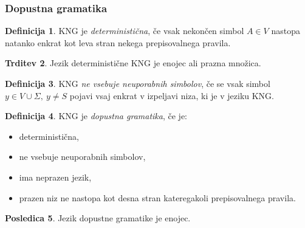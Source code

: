 \documentclass{beamer}
\theoremstyle{definition}
\newtheorem{definicija}{Definicija}[section]
\newtheorem{trditev}[definicija]{Trditev}
\newtheorem{posledica}[definicija]{Posledica}
\begin{document}
\begin{frame}
    \frametitle{Dopustna gramatika}
    \begin{definicija}
        KNG je \emph{deterministična}, če vsak nekončen simbol $A \in V$ nastopa natanko enkrat
        kot leva stran nekega prepisovalnega pravila.
    \end{definicija}
    \pause
    \begin{trditev}
        Jezik deterministične KNG je enojec ali prazna množica.
    \end{trditev}
\end{frame}

\begin{frame}
    \begin{definicija}
        KNG \emph{ne vsebuje neuporabnih simbolov}, 
        če se vsak simbol $ y \in V \cup \Sigma, \ y \neq S $ pojavi vsaj enkrat v izpeljavi 
        niza, ki je v jeziku KNG.
    \end{definicija}
\end{frame}


\begin{frame}
    \begin{definicija}
        KNG je \emph{dopustna gramatika}, če je:
        \begin{itemize}
            \item deterministična,
            \item ne vsebuje neuporabnih simbolov,
            \item ima neprazen jezik,
            \item prazen niz ne nastopa kot desna stran kateregakoli prepisovalnega 
            pravila.
        \end{itemize}
    \end{definicija}
    \pause
    \begin{posledica}
        Jezik dopustne gramatike je enojec. 
    \end{posledica}
\end{frame}
\end{document}
